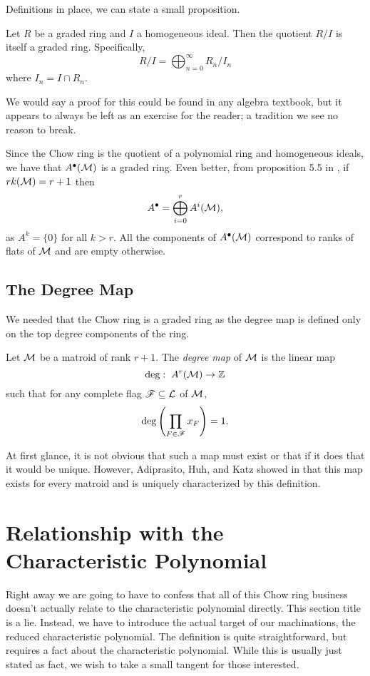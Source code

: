 \documentclass[12pt,oneside]{../../sfsuthesis}
\begin{document}
Definitions in place, we can state a small proposition.
\begin{proposition}
    Let \( R \) be a graded ring and \( I \) a homogeneous ideal.
    Then the quotient \( R/I \) is itself a graded ring.
    Specifically,
    \[
        R/I = \bigoplus_{n=0}^\infty R_n/I_n
    \]
    where \( I_n = I \cap R_n \).
\end{proposition}
We would say a proof for this could be found in any algebra textbook, but it appears to always be left as an exercise for the reader; a tradition we see no reason to break.

Since the Chow ring is the quotient of a polynomial ring and homogeneous ideals, we have that \( A^\bullet(\mathcal{M}) \) is a graded ring.
Even better, from proposition 5.5 in \cite{adiprasitoHodgeTheoryCombinatorial2018}, if \( rk(\mathcal{M}) = r + 1 \) then
\[
    A^\bullet = \bigoplus_{i=0}^r A^i(\mathcal{M}),
\]
as \( A^k = \{ 0 \} \) for all \( k > r \).
All the components of \( A^\bullet(\mathcal{M}) \) correspond to ranks of flats of \( \mathcal{M} \) and are empty otherwise.


\subsection{The Degree Map}

We needed that the Chow ring is a graded ring as the degree map is defined only on the top degree components of the ring.
\begin{definition}\label{def:degMap}
    Let \( \mathcal{M} \) be a matroid of rank \( r + 1 \).
    The \emph{degree map} of \( \mathcal{M} \) is the linear map
    \[
        \deg:\; A^r(\mathcal{M}) \to \mathbb{Z}
    \]
    such that for any complete flag \( \mathscr{F} \subseteq \mathcal{L} \) of \( \mathcal{M} \),
    \[
        \deg \left( \prod_{F \in \mathscr{F}}x_F \right) = 1.
    \]
\end{definition}

At first glance, it is not obvious that such a map must exist or that if it does that it would be unique.
However, Adiprasito, Huh, and Katz showed in \cite{adiprasitoHodgeTheoryCombinatorial2018} that this map exists for every matroid and is uniquely characterized by this definition.

\section{Relationship with the Characteristic Polynomial}

Right away we are going to have to confess that all of this Chow ring business doesn't actually relate to the characteristic polynomial directly.
This section title is a lie.
Instead, we have to introduce the actual target of our machinations, the reduced characteristic polynomial.
The definition is quite straightforward, but requires a fact about the characteristic polynomial.
While this is usually just stated as fact, we wish to take a small tangent for those interested.
\end{document}
